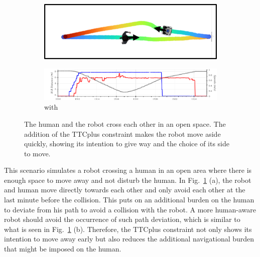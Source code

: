 \begin{figure}[H]
\begin{subfigure}{0.5\columnwidth}
  \includegraphics[width=\textwidth]{images/appendix/ttc/wide/with.png}
\end{subfigure}
\begin{subfigure}{0.8\columnwidth}
  \includegraphics[width=\textwidth]{images/appendix/ttc/wide/wide_with2.png}
  \caption{with}
\end{subfigure}
\caption{The human and the robot cross each other in an open space. The addition of the TTCplus constraint makes the robot move aside quickly, showing its intention to give way and the choice of its side to move.}
\label{fig:open_space_ttc}
\end{figure} 

\hspace{\parindent} This scenario simulates a robot crossing a human in an open area where there is enough space to move away and not disturb the human. In Fig.~\ref{fig:open_space_ttc} (a), the robot and human move directly towards each other and only avoid each other at the last minute before the collision. This puts on an additional burden on the human to deviate from his path to avoid a collision with the robot. A more human-aware robot should avoid the occurrence of such path deviation, which is similar to what is seen in Fig.~\ref{fig:open_space_ttc} (b). Therefore, the TTCplus constraint not only shows its intention to move away early but also reduces the additional navigational burden that might be imposed on the human.  

